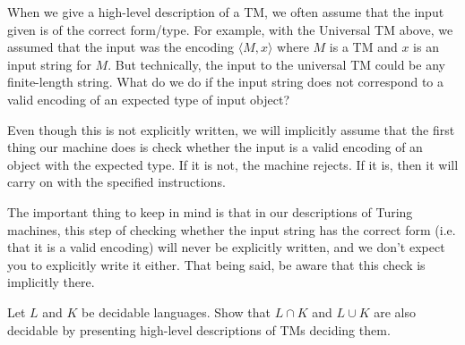 \begin{important}
\label{important:Checking-the-input-type}
When we give a high-level description of a TM, we often assume that the input given is of the correct form/type. For example, with the Universal TM above, we assumed that the input was the encoding $\langle M,x \rangle$ where $M$ is a TM and $x$ is an input string for $M$. But technically, the input to the universal TM could be any finite-length string. What do we do if the input string does not correspond to a valid encoding of an expected type of input object?

Even though this is not explicitly written, we will implicitly assume that the first thing our machine does is check whether the input is a valid encoding of an object with the expected type. If it is not, the machine rejects. If it is, then it will carry on with the specified instructions.

The important thing to keep in mind is that in our descriptions of Turing machines, this step of checking whether the input string has the correct form (i.e. that it is a valid encoding) will never be explicitly written, and we don't expect you to explicitly write it either. That being said, be aware that this check is implicitly there.

\end{important}

\begin{exercise}
\label{exercise:Decidability-is-closed-under-intersection-and-union}
Let $L$ and $K$ be decidable languages. Show that $L \cap K$ and $L \cup K$ are also decidable by presenting high-level descriptions of TMs deciding them.

\end{exercise}

